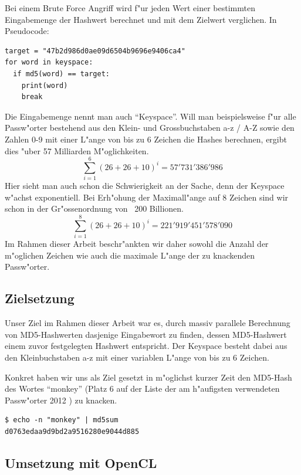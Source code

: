 \begin{refsection}
Bei einem Brute Force Angriff wird f"ur jeden Wert einer bestimmten
Eingabemenge der Hash\-wert berechnet und mit dem Zielwert verglichen. In
Pseudocode:

\begin{verbatim}
target = "47b2d986d0ae09d6504b9696e9406ca4"
for word in keyspace:
  if md5(word) == target:
    print(word)
    break
\end{verbatim}

\label{crypto:keyspace}
Die Eingabemenge nennt man auch ``Keyspace''. Will man beispielsweise f"ur alle
Passw"orter bestehend aus den Klein- und Grossbuchstaben a-z / A-Z sowie den
Zahlen 0-9 mit einer L"ange von bis zu 6 Zeichen die Hashes berechnen, ergibt
dies "uber 57 Milliarden M"oglichkeiten.
\[
	\sum_{i=1}^{6} \left(26 + 26 + 10\right)^i = 57'731'386'986
\]
Hier sieht man auch schon die Schwierigkeit an der Sache, denn der Keyspace
w"achst exponentiell. Bei Erh"ohung der Maximall"ange auf 8 Zeichen sind wir schon
in der Gr"ossenordnung von ~200 Billionen.
\[
	\sum_{i=1}^{8} \left(26 + 26 + 10\right)^i = 221'919'451'578'090
\]
Im Rahmen dieser Arbeit beschr"ankten wir daher sowohl die Anzahl der m"oglichen
Zeichen wie auch die maximale L"ange der zu knackenden Passw"orter.


\subsection{Zielsetzung}
\label{crypto:zielsetzung}

Unser Ziel im Rahmen dieser Arbeit war es, durch massiv parallele Berechnung von
MD5-Hashwerten dasjenige Eingabewort zu finden, dessen MD5-Hashwert einem zuvor
festgelegten Hashwert entspricht. Der Keyspace besteht dabei aus den
Kleinbuchstaben a-z mit einer variablen L"ange von bis zu 6 Zeichen.

Konkret haben wir uns als Ziel gesetzt in m"oglichst kurzer Zeit den MD5-Hash
des Wortes ``monkey'' (Platz 6 auf der Liste der am h"aufigsten verwendeten
Passw"orter 2012 \cite{crypto:splash2012}) zu knacken.

\begin{verbatim}
$ echo -n "monkey" | md5sum
d0763edaa9d9bd2a9516280e9044d885
\end{verbatim}

\subsection{Umsetzung mit OpenCL}


\end{refsection}

